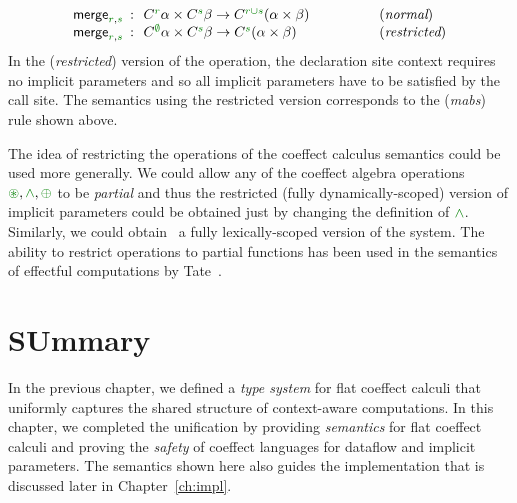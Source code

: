 \begin{equation*}
\begin{array}{rcll}
 \ident{merge}_{\cclrd{r}, \cclrd{s}} &\narrow{:}& \ctyp{\cclrd{r}}\alpha \times \ctyp{\cclrd{s}}\beta \rightarrow \ctyp{\cclrd{r \cup s}}(\alpha \times \beta)
 &\hspace{4em}(\textit{normal}) \\
 \ident{merge}_{\cclrd{r}, \cclrd{s}} &\narrow{:}& \ctyp{\cclrd{\emptyset}}\alpha \times \ctyp{\cclrd{s}}\beta \rightarrow \ctyp{\cclrd{s}}(\alpha \times \beta)
 &\hspace{4em}(\textit{restricted})
\end{array}
\end{equation*}
%
In the (\emph{restricted}) version of the operation, the declaration site context requires
no implicit parameters and so all implicit parameters have to be satisfied by the call site.
The semantics using the restricted version corresponds to the (\emph{mabs}) rule shown above.

The idea of restricting the operations of the coeffect calculus semantics could be used more
generally. We could allow any of the coeffect algebra operations $\cseq, \czip, \cpar$ to be
\emph{partial} and thus the restricted (fully dynamically-scoped) version of implicit parameters
could be obtained just by changing the definition of $\czip$. Similarly, we could obtain \eg~a
fully lexically-scoped version of the system. The ability to restrict operations to partial
functions has been used in the semantics of effectful computations by Tate~\cite{effects-producer-semantics}.



%
%



\section{SUmmary}

In the previous chapter, we defined a \emph{type system} for flat coeffect calculi that uniformly
captures the shared structure of context-aware computations. In this chapter, we completed
the unification by providing \emph{semantics} for flat coeffect calculi and proving the
\emph{safety} of coeffect languages for dataflow and implicit parameters. The semantics shown
here also guides the implementation that is discussed later in Chapter~\ref{ch:impl}.

